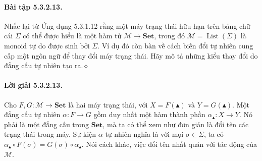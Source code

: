 \paragraph{Bài tập 5.3.2.13.} Nhắc lại từ Ứng dụng 5.3.1.12 rằng một máy trạng thái hữu hạn trên bảng chữ cái $\Sigma$ có thể được hiểu là một hàm tử $\mathcal M\to\mathbf{Set}$, trong đó $\mathcal M=\operatorname{List}(\Sigma)$ là monoid tự do được sinh bởi $\Sigma$. Ví dụ đó còn bàn về cách biến đổi tự nhiên cung cấp một ngôn ngữ để thay đổi máy trạng thái. Hãy mô tả những kiểu thay đổi do đẳng cấu tự nhiên tạo ra.\hfill$\diamond$
\paragraph{Lời giải 5.3.2.13.} Cho $F,G:\mathcal M\to\mathbf{Set}$ là hai máy trạng thái, với $X=F(\blacktriangle)$ và $Y=G(\blacktriangle)$. Một đẳng cấu tự nhiên $\alpha:F\to G$ gồm duy nhất một hàm thành phần $\alpha_{\blacktriangle}:X\to Y$. Nó phải là một đẳng cấu trong $\mathbf{Set}$, mà ta có thể xem như đơn giản là đổi tên các trạng thái trong máy. Sự kiện $\alpha$ tự nhiên nghĩa là với mọi $\sigma\in\Sigma$, ta có $\alpha_{\blacktriangle}\circ F(\sigma)=G(\sigma)\circ\alpha_{\blacktriangle}$. Nói cách khác, việc đổi tên nhất quán với tác động của $\mathcal M$.

